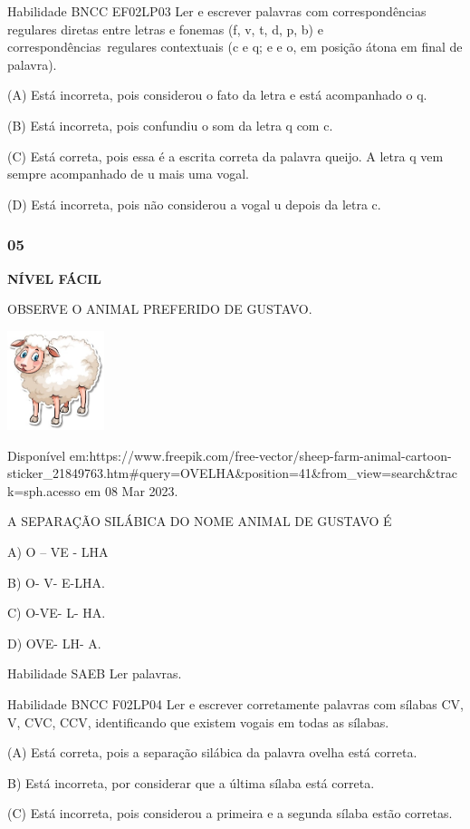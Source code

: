 Habilidade BNCC EF02LP03 Ler e escrever palavras com correspondências
regulares diretas entre letras e fonemas (f, v, t, d, p, b) e
correspondências~regulares contextuais (c e q; e e o, em posição átona
em final de palavra).

(A) Está incorreta, pois considerou o fato da letra e está acompanhado o
q.

(B) Está incorreta, pois confundiu o som da letra q com c.

(C) Está correta, pois essa é a escrita correta da palavra queijo. A
letra q vem sempre acompanhado de u mais uma vogal.

(D) Está incorreta, pois não considerou a vogal u depois da letra c.

\subsubsection{05}\label{section-98}

\textbf{NÍVEL FÁCIL}

OBSERVE O ANIMAL PREFERIDO DE GUSTAVO.

\includegraphics[width=1.11458in,height=1.13889in]{media/image142.jpeg}

Disponível
em:https://www.freepik.com/free-vector/sheep-farm-animal-cartoon-sticker\_21849763.htm\#query=OVELHA\&position=41\&from\_view=search\&track=sph.acesso
em 08 Mar 2023.

A SEPARAÇÃO SILÁBICA DO NOME ANIMAL DE GUSTAVO É

A) O -- VE - LHA

B) O- V- E-LHA.

C) O-VE- L- HA.

D) OVE- LH- A.

Habilidade SAEB Ler palavras.

Habilidade BNCC F02LP04 Ler e escrever corretamente palavras com sílabas
CV, V, CVC, CCV, identificando que existem vogais em todas as sílabas.

(A) Está correta, pois a separação silábica da palavra ovelha está
correta.

B) Está incorreta, por considerar que a última sílaba está correta.

(C) Está incorreta, pois considerou a primeira e a segunda sílaba estão
corretas.

